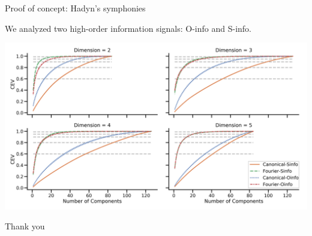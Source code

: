 \documentclass[10pt,t, handout]{beamer} %
\begin{document}
\begin{frame}{Proof of concept: Hadyn's symphonies}
	\vskip 5pt
	\pause

	We analyzed two high-order information signals: O-info and S-info.

	\vskip 7pt
	\pause

	\hspace*{-15pt}\includegraphics[scale=.096]{media/hyperharmonic}
\end{frame}

{
	\begin{frame}
		\vskip 6cm
		\begin{center}
			\textcolor{pblue}{\Huge Thank you}
		\end{center}
	\end{frame}
}
\end{document}
